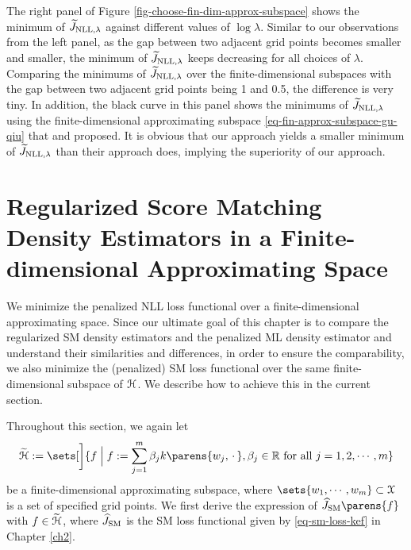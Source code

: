 The right panel of Figure \ref{fig-choose-fin-dim-approx-subspace} shows the minimum of $\widetilde{J}_{\mathrm{NLL}, \lambda}$ against different values of $\log \lambda$. Similar to our observations from the left panel, as the gap between two adjacent grid points becomes smaller and smaller, the minimum of $\widetilde{J}_{\mathrm{NLL}, \lambda}$ keeps decreasing for all choices of $\lambda$. Comparing the minimums of $\widetilde{J}_{\mathrm{NLL}, \lambda}$ over the finite-dimensional subspaces with the gap between two adjacent grid points being 1 and 0.5, the difference is very tiny. In addition, the black curve in this panel shows the minimums of $\widetilde{J}_{\mathrm{NLL}, \lambda}$ using the finite-dimensional approximating subspace \eqref{eq-fin-approx-subspace-gu-qiu} that \textcite{Gu1993-na} and \textcite{Gu1993-lf} proposed. It is obvious that our approach yields a smaller minimum of $\widetilde{J}_{\mathrm{NLL}, \lambda}$ than their approach does, implying the superiority of our approach. 

\section{Regularized Score Matching Density Estimators in a Finite-dimensional Approximating Space}\label{section-computation-sm-density-estimator}

We minimize the penalized NLL loss functional over a finite-dimensional approximating space. Since our ultimate goal of this chapter is to compare the regularized SM density estimators and the penalized ML density estimator and understand their similarities and differences, in order to ensure the comparability, we also minimize the (penalized) SM loss functional over the same finite-dimensional subspace of $\mathcal{H}$. We describe how to achieve this in the current section. 

Throughout this section, we again let 
\begin{align*}
	\widetilde{\calH} :=\sets[\bigg]{f \Bigm| f := \sum_{j=1}^m \beta_j k \parens{w_j, \,\cdot\,}, \beta_j \in \Real \text{ for all } j = 1, 2, \cdots, m} 
\end{align*}
be a finite-dimensional approximating subspace, where $\sets{w_1, \cdots, w_m} \subset \calX$ is a set of specified grid points. We first derive the expression of $\widehat{J}_{\SM} \parens{f}$ with $f \in \widetilde{\mathcal{H}}$, where $\widehat{J}_{\mathrm{SM}}$ is the SM loss functional given by \eqref{eq-sm-loss-kef} in Chapter \ref{ch2}. 

